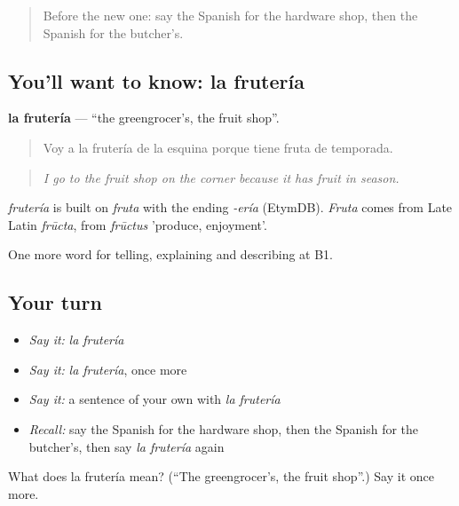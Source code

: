 \label{lesson:ES-C770-fruteria}



\begin{quote}
Before the new one: say the Spanish for the hardware shop, then the Spanish for the butcher's.
\end{quote}

\subsection*{You'll want to know: la frutería}
\textbf{la frutería} — \textquotedblleft{}the greengrocer's, the fruit shop\textquotedblright{}.

\begin{quote}
Voy a la frutería de la esquina porque tiene fruta de temporada.
\end{quote}

\begin{quote}
\emph{I go to the fruit shop on the corner because it has fruit in season.}
\end{quote}

\begin{cousinweb}
\emph{frutería} is built on \emph{fruta} with the ending \emph{-ería} (EtymDB). \emph{Fruta} comes from Late Latin \emph{frūcta}, from \emph{frūctus} 'produce, enjoyment'.
\end{cousinweb}

\begin{grammarlens}[title={What you've built}]
One more word for telling, explaining and describing at B1.
\end{grammarlens}

\subsection*{Your turn}
\begin{itemize}
\raggedright
  \item \emph{Say it:} \emph{la frutería}
  \item \emph{Say it:} \emph{la frutería}, once more
  \item \emph{Say it:} a sentence of your own with \emph{la frutería}
  \item \emph{Recall:} say the Spanish for the hardware shop, then the Spanish for the butcher's, then say \emph{la frutería} again
\end{itemize}

\begin{tcolorbox}[breakable,colback=teal!4,colframe=teal!35!black,title={Before you move on}]
What does la frutería mean? (\textquotedblleft{}The greengrocer's, the fruit shop\textquotedblright{}.) Say it once more.
\end{tcolorbox}
